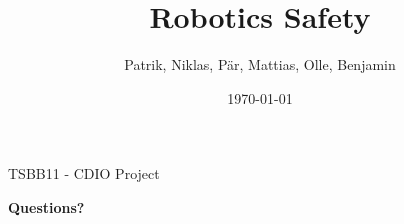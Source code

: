 \documentclass{beamer}
\title[Mister Roboto]{Robotics Safety}
\author{Patrik, Niklas, Pär, Mattias, Olle, Benjamin}
\institute{Computer Vision}
\date{\today}
\begin{document}
\begin{frame}{TSBB11 - CDIO Project}
	\titlepage
\end{frame}










\begin{frame}
	\Huge
	\centering
	\textbf{Questions?}
\end{frame}
 
\end{document}
